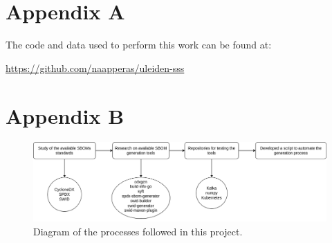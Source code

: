 \appendix

\section{Appendix A}

The code and data used to perform this work can be found at:
\begin{center}
    \href{https://github.com/Naapperas/uleiden-sss/tree/main/assignments/2}{https://github.com/naapperas/uleiden-sss}
\end{center}

\section{Appendix B}
\begin{figure}[h]
    \centering
    \includegraphics[width=\textwidth]{diagram processes.drawio.png}
    \caption{Diagram of the processes followed in this project.}
    \label{fig:diagram-processes}
\end{figure}